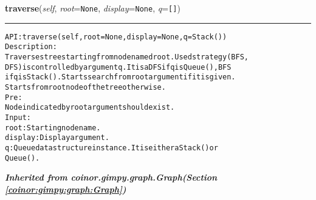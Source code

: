     \label{coinor:gimpy:tree:Tree:traverse}

    \vspace{0.5ex}

\hspace{.8\funcindent}\begin{boxedminipage}{\funcwidth}

    \raggedright \textbf{traverse}(\textit{self}, \textit{root}={\tt None}, \textit{display}={\tt None}, \textit{q}={\tt []})

    \vspace{-1.5ex}

    \rule{\textwidth}{0.5\fboxrule}
\setlength{\parskip}{2ex}
\begin{alltt}

API: traverse(self, root = None, display = None, q = Stack())
Description:
    Traverses tree starting from node named root. Used strategy (BFS,
    DFS) is controlled by argument q. It is a DFS if q is Queue(), BFS
    if q is Stack(). Starts search from root argument if it is given.
    Starts from root node of the tree otherwise.
Pre:
    Node indicated by root argument should exist.
Input:
    root: Starting node name.
    display: Display argument.
    q: Queue data structure instance. It is either a Stack() or
    Queue().
\end{alltt}

\setlength{\parskip}{1ex}
    \end{boxedminipage}


\large{\textbf{\textit{Inherited from coinor.gimpy.graph.Graph\textit{(Section \ref{coinor:gimpy:graph:Graph})}}}}

